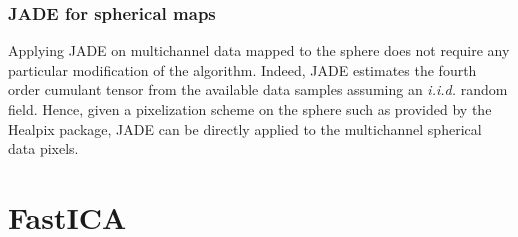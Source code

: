 \subsubsection{JADE for spherical maps}

Applying JADE on multichannel data mapped to the sphere does not require any particular modification of the algorithm. Indeed, JADE estimates 
the fourth order cumulant tensor from the available data samples assuming an \emph{i.i.d.} random field. Hence, given a pixelization scheme on 
the sphere such as provided by the Healpix package, JADE can be directly applied to the multichannel spherical data pixels.


\section{FastICA}

